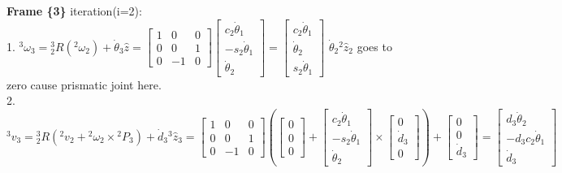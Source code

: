 \documentclass{article}
\begin{document}
\textbf{Frame \{3\}} iteration(i=2):\\
1. ${}^3 \omega_3 = {}^3_2R ({}^2 \omega_2) + \dot{\theta}_3 \hat{z} =\begin{bmatrix}
1 & 0 & 0\\
0 & 0 & 1\\
0 & -1 & 0
\end{bmatrix} \begin{bmatrix}
    c_2\dot{\theta}_1\\
    -s_2\dot{\theta}_1\\
    \dot{\theta}_2
\end{bmatrix}  = \begin{bmatrix}
    c_2\dot{\theta}_1\\
    \dot{\theta}_2\\
    s_2\dot{\theta}_1
\end{bmatrix}$ $\dot{\theta}_{2} {}^{2}\hat{z}_{2}$ goes to zero cause prismatic joint here.\\
2. ${}^{3}v_{3}={}^{3}_2R({}^2 v_2 + {}^2 \omega_2 \times {}^2 P_{3}) + \dot{d}_{3} {}^{3}\hat{z}_{3}=
\begin{bmatrix}
1 & 0 & 0\\
0 & 0 & 1\\
0 & -1 & 0
\end{bmatrix} (\begin{bmatrix}
    0\\
    0\\
    0
\end{bmatrix} + \begin{bmatrix}
    c_2\dot{\theta}_1\\
    -s_2\dot{\theta}_1\\
    \dot{\theta}_2
\end{bmatrix} \times \begin{bmatrix}
    0\\
    \dot{d}_3\\
    0
\end{bmatrix}) + \begin{bmatrix}
    0\\
    0\\
    \dot{d}_3
\end{bmatrix}=
\begin{bmatrix}
    d_3\dot{\theta}_2\\
    -d_3c_2\dot{\theta}_1\\
    \dot{d}_3
\end{bmatrix}$ \\\\
\end{document}
